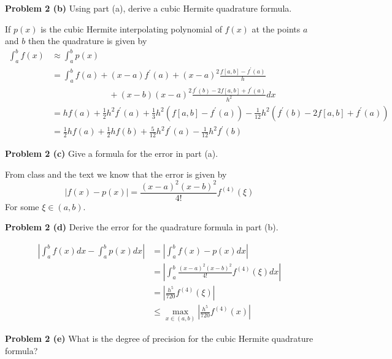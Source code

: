 \documentclass[12pt]{article}
\newcommand{\problem}[1]{\hspace{-4 ex} \large \textbf{Problem #1} }
\begin{document}
\bigbreak
\problem{2 (b)} Using part (a), derive a cubic Hermite quadrature formula. \bigbreak

	If $p(x)$ is the cubic Hermite interpolating polynomial of $f(x)$ at the points $a$ and $b$ then the quadrature is given by
	\begin{align*}
		\int_a^b f(x) & \approx \int_a^b p(x) \\
		& = \int_a^b f(a) + (x-a)f^\prime(a) + (x-a)^2 \frac{f[a,b]-f^\prime(a)}{h} \\
		& \phantom{=====} + (x-b)(x-a)^2 \frac{f^\prime(b) - 2f[a,b] + f^\prime(a)}{h^2} dx \\
		& = hf(a) + \tfrac{1}{2}h^2f^\prime(a) + \tfrac{1}{3}h^2 (f[a,b]-f^\prime(a)) - \tfrac{1}{12}h^2 (f^\prime(b) - 2f[a,b] + f^\prime(a)) \\
		& = \tfrac{1}{2}hf(a) + \tfrac{1}{2}hf(b) + \tfrac{5}{12}h^2f^\prime(a) - \tfrac{1}{12}h^2f^\prime(b)
	\end{align*}
	
\bigbreak
\problem{2 (c)} Give a formula for the error in part (a). \bigbreak 

	From class and the text we know that the error is given by
	$$
	\vert f(x) - p(x) \vert = \frac{(x-a)^2(x-b)^2}{4!}f^{(4)}(\xi)
	$$
	For some $\xi \in (a,b)$.
	
\bigbreak
\problem{2 (d)} Derive the error for the quadrature formula in part (b). \bigbreak

	\begin{align*}
		\left \vert \int_a^b f(x) dx - \int_a^b p(x) dx \right \vert &= \left \vert \int_a^b f(x) - p(x) dx \right \vert \\
		& = \left \vert \int_a^b \frac{(x-a)^2(x-b)^2}{4!}f^{(4)}(\xi) dx \right \vert \\
		& = \left \vert \frac{h^5}{720}f^{(4)}(\xi) \right \vert \\
		& \leq \max_{x \in (a,b)}\left \vert \frac{h^5}{720}f^{(4)}(x) \right \vert
	\end{align*}
	
\bigbreak
\problem{2 (e)} What is the degree of precision for the cubic Hermite quadrature formula? \bigbreak
\end{document}
